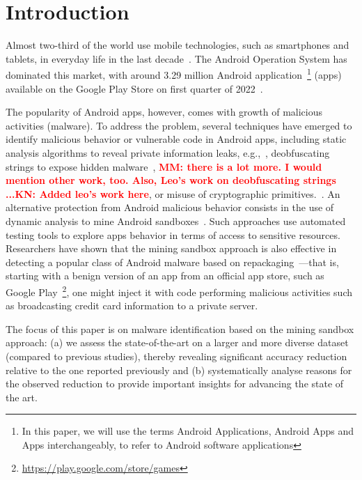 \section{Introduction}\label{sec:introduction}

Almost two-third of the world use mobile technologies, such as smartphones and tablets, in everyday life in the last decade~\cite{Comscore,DBLP:journals/tse/MartinSJZH17}. The Android Operation System has dominated this market, with around 3.29 million Android application~\footnote{In this paper, we will use the terms Android Applications, Android Apps and Apps interchangeably, to refer to Android software applications} (apps) available on the Google Play Store on first quarter of 2022~\cite{Statista}. 

The popularity of Android apps, however,
comes with growth of malicious activities (malware).  
To address the problem,
several techniques have emerged to identify malicious behavior or vulnerable code in Android apps, 
including static analysis algorithms to reveal private information 
leaks, e.g.,~\cite{DBLP:conf/pldi/ArztRFBBKTOM14}, deobfuscating strings to expose hidden malware~\cite{GlanzMBRAAM20}, \textcolor{red}{\textbf{MM: there is a lot more. I would mention other work, too. Also, Leo's work on deobfuscating strings ...KN: Added leo's work here}}, or misuse of 
cryptographic primitives.~\cite{DBLP:journals/tse/KrugerSABM21}. 
An alternative
protection from Android malicious behavior consists in the use of dynamic analysis to mine Android sandboxes~\cite{DBLP:conf/icse/JamrozikSZ16}. Such approaches use automated testing tools 
to explore apps behavior in terms of access to sensitive resources. Researchers have shown that the mining sandbox approach is also effective in detecting a popular class of Android malware based on repackaging~\cite{DBLP:conf/wcre/BaoLL18,le2018towards}---that is, starting with a benign version of an app from an official app store, such as Google Play~\footnote{\url{https://play.google.com/store/games}}, one might inject it with code performing malicious activities such as broadcasting credit card information to a private server.~\cite{DBLP:journals/tse/LiBK21} %

The focus of this paper is on malware identification based on the mining sandbox approach: 
(a) we assess the state-of-the-art on a larger and more diverse dataset (compared to previous studies),
thereby revealing significant accuracy reduction relative to the one reported previously and 
(b) systematically analyse reasons for the observed reduction to provide important insights for 
advancing the state of the art.

